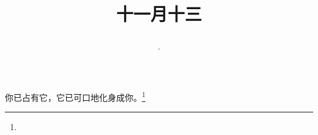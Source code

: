 \title{\date[d=13,m=12,y=2024][year:cn-y,年,month:cn,day:cn,日,·,weekday]·十一月十三 }
你已占有它，它已可口地化身成你。\footnote{ }

